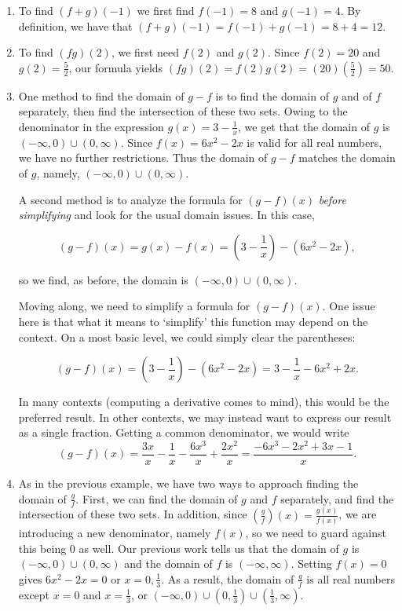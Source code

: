 {
\begin{enumerate}

\item  To find $(f+g)(-1)$ we first find $f(-1) = 8$ and $g(-1) = 4$. By definition, we have that $(f+g)(-1) = f(-1) + g(-1) = 8+4 = 12$.


\item To find $(fg)(2)$, we first need $f(2)$ and $g(2)$. Since $f(2) = 20$ and $g(2) = \frac{5}{2}$, our formula yields $(fg)(2) = f(2) g(2) = (20)\left(\frac{5}{2}\right) = 50$.

\item One method to find the domain of $g-f$ is to find the domain of $g$ and of $f$ separately, then find the intersection of these two sets.  Owing to the denominator in the expression $g(x) = 3 - \frac{1}{x}$, we get that the domain of $g$ is $(-\infty, 0) \cup (0, \infty)$.  Since $f(x) = 6x^2-2x$ is valid for all real numbers, we have no further restrictions.  Thus the domain of $g-f$ matches the domain of $g$, namely, $(-\infty, 0) \cup (0, \infty)$.

A second method is to analyze the formula for $(g-f)(x)$ \textit{before simplifying} and look for the usual domain issues.  In this case, 

\[
 (g-f)(x) = g(x) - f(x) = \left(3-\dfrac{1}{x}\right) - \left(6x^2 - 2x\right),
\]

so we find, as before, the domain is $(-\infty, 0) \cup (0, \infty)$.

Moving along, we need to simplify a formula for $(g-f)(x)$.  One issue here is that what it means to `simplify' this function may depend on the context. On a most basic level, we could simply clear the parentheses:

\[
(g-f)(x) = \left(3-\dfrac{1}{x}\right) - \left(6x^2 - 2x\right) = 3 - \dfrac{1}{x} - 6x^2 + 2x.
\]

In many contexts (computing a derivative comes to mind), this would be the preferred result. In other contexts, we may instead want to express our result as a single fraction. Getting a common denominator, we would write
\[
(g-f)(x) =  \dfrac{3x}{x} - \dfrac{1}{x} - \dfrac{6x^3}{x} + \dfrac{2x^2}{x}  =   \dfrac{-6x^3-2x^2+3x-1}{x}.
\]

\drawexampleline

\item  As in the previous example, we have two ways to approach finding the domain of $\frac{g}{f}$.  First, we can find the domain of $g$ and $f$ separately, and find the intersection of these two sets.  In addition, since $\left(\frac{g}{f}\right)(x) = \frac{g(x)}{f(x)}$, we are introducing a new denominator, namely $f(x)$, so we need to guard against this being $0$ as well.  Our previous work tells us that the domain of $g$ is $(-\infty, 0) \cup (0, \infty)$ and the domain of $f$ is $(-\infty, \infty)$.  Setting $f(x) = 0$ gives $6x^2 - 2x = 0$ or $x = 0, \frac{1}{3}$.  As a result, the domain of $\frac{g}{f}$ is all real numbers except $x = 0$ and $x = \frac{1}{3}$, or $(-\infty, 0) \cup \left(0, \frac{1}{3} \right) \cup \left( \frac{1}{3}, \infty \right)$.


\end{enumerate}}
